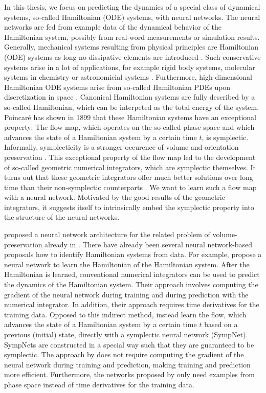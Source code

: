 \documentclass[twoside,a4paper]{article}
\begin{document}
In this thesis, we focus on predicting the dynamics of a special class of dynamical
systems, so-called Hamiltonian (ODE) systems, with neural networks. The neural networks
are fed from example data of the dynamical behavior of the Hamiltonian system,
possibly from real-word measurements or simulation results.
Generally, mechanical systems resulting from physical principles are
Hamiltonian (ODE) systems as long no dissipative elements are introduced 
\cite{leimkuhler_reich_2005}. Such conservative systems arise in a lot
of applications, for example rigid body systems, molecular systems in chemistry or
astronomicial systems \cite{leimkuhler_reich_2005}. Furthermore, high-dimensional
Hamiltonian ODE systems arise from so-called Hamiltonian PDEs upon discretization
in space \cite{leimkuhler_reich_2005}. Canonical Hamiltonian systems are fully described
by a so-called Hamiltonian, which can be interpeted as the total energy of the system.
Poincaré has shown in 1899 that these Hamiltonian
systems have an exceptional property: The flow map, which operates on the so-called phase space 
and which advances the state of a Hamiltonian system by a certain time $t$, is symplectic. 
Informally, symplecticity is a stronger occurence of volume and orientation preservation
\cite{leimkuhler_reich_2005}. This exceptional property of the flow map led to the development of 
so-called geometric numerical integrators, which are symplectic themselves. It turns out 
that these geometric integrators offer much better solutions over long time than their
non-symplectic counterparts \cite{hairer2006}. We want to learn such a flow map with 
a neural network. Motivated by the good results of the geometric integrators,
it suggests itself to intrinsically embed the symplectic property into the structure
of the neural networks.

\citet{Deco1995} proposed a neural network architecture for the related
problem of volume-preservation already in \citeyear{Deco1995}. 
There have already been several neural network-based proposals how to identify 
Hamiltonian systems from data.
For example, \citet{Greydanus2019} propose a neural network to learn the Hamiltonian
of the Hamiltonian system. After the Hamiltonian is learned, conventional numerical
integrators can be used to predict the dynamics of the Hamiltonian system.
Their approach involves computing the gradient of the neural network during training
and during prediction with the numerical integrator. In addition, their approach 
requires time derivatives for the training data.
Opposed to this indirect method, \citet{Jin2020} instead learn the flow, 
which advances the state of a Hamiltonian system by a certain time $t$ based on a
previous (initial) state, directly with a symplectic neural network (SympNet). 
SympNets are constructed in a special way such that they are guaranteed to be symplectic.
The approach by \citeauthor{Jin2020} does not require computing the gradient of the neural
network during training and prediction, making training and 
prediction more efficient. Furthermore, the networks proposed by \citeauthor{Jin2020}
only need examples from phase space instead of time derivatives for the training data.
\end{document}
